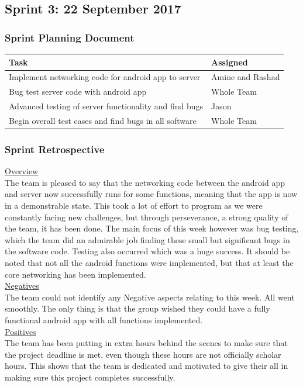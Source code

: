 \documentclass[a4paper,12pt]{article}
\begin{document}
\subsection{Sprint 3: 22 September 2017}
\subsubsection{Sprint Planning Document}
\begin{tabular}{|p{9.5cm}|p{3.5cm}|}
\hline
Task & Assigned \\ \hline
Implement networking code for android app to server & Amine and Rashad \\ \hline
Bug test server code with android app & Whole Team \\ \hline
Advanced testing of server functionality and find bugs & Jason \\ \hline
Begin overall test cases and find bugs in all software & Whole Team \\ \hline
\end{tabular}

\subsubsection{Sprint Retrospective}
\underline{Overview}\\
The team is pleased to say that the networking code between the android app and server now successfully runs for some functions, meaning that the app is now in a demonstrable state. This took a lot of effort to program as we were constantly facing new challenges, but through perseverance, a strong quality of the team, it has been done. The main focus of this week however was bug testing, which the team did an admirable job finding these small but significant bugs in the software code. Testing also occurred which was a huge success. It should be noted that not all the android functions were implemented, but that at least the core networking has been implemented.\\
\underline{Negatives}\\
The team could not identify any Negative aspects relating to this week. All went smoothly. The only thing is that the group wished they could have a fully functional android app with all functions implemented.\\
\underline{Positives}\\
The team has been putting in extra hours behind the scenes to make sure that the project deadline is met, even though these hours are not officially scholar hours. This shows that the team is dedicated and motivated to give their all in making sure this project completes successfully. 
\end{document}
